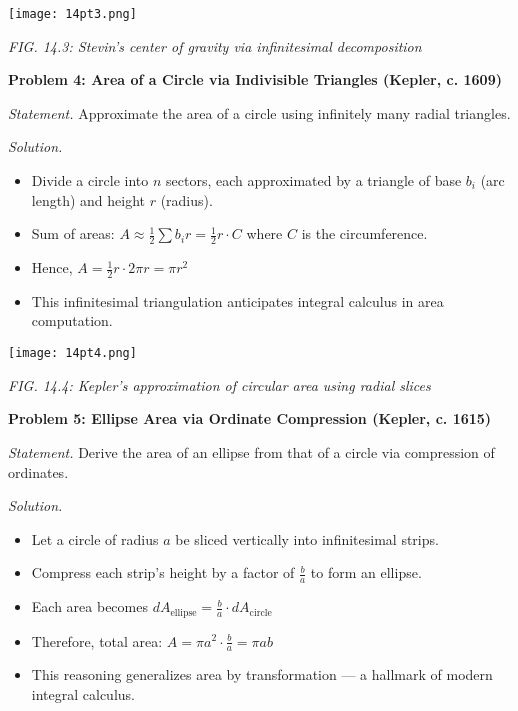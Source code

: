 \documentclass[9pt]{article}
\begin{document}
\begin{center}
    \texttt{[image: 14pt3.png]}

    \textit{FIG. 14.3: Stevin’s center of gravity via infinitesimal decomposition}
\end{center}

\newpage

\textbf{Problem 4: Area of a Circle via Indivisible Triangles (Kepler, c. 1609)}

\textit{Statement.} Approximate the area of a circle using infinitely many radial triangles.

\textit{Solution.}
\begin{itemize}
    \item Divide a circle into $n$ sectors, each approximated by a triangle of base $b_i$ (arc length) and height $r$ (radius).
    \item Sum of areas: $A \approx \tfrac{1}{2} \sum b_i r = \tfrac{1}{2} r \cdot C$ where $C$ is the circumference.
    \item Hence, $A = \tfrac{1}{2} r \cdot 2\pi r = \pi r^2$
    \item This infinitesimal triangulation anticipates integral calculus in area computation.
\end{itemize}

\begin{center}
    \texttt{[image: 14pt4.png]}

    \textit{FIG. 14.4: Kepler’s approximation of circular area using radial slices}
\end{center}

\newpage

\textbf{Problem 5: Ellipse Area via Ordinate Compression (Kepler, c. 1615)}

\textit{Statement.} Derive the area of an ellipse from that of a circle via compression of ordinates.

\textit{Solution.}
\begin{itemize}
    \item Let a circle of radius $a$ be sliced vertically into infinitesimal strips.
    \item Compress each strip’s height by a factor of $\frac{b}{a}$ to form an ellipse.
    \item Each area becomes $dA_{\text{ellipse}} = \tfrac{b}{a} \cdot dA_{\text{circle}}$
    \item Therefore, total area: $A = \pi a^2 \cdot \frac{b}{a} = \pi ab$
    \item This reasoning generalizes area by transformation — a hallmark of modern integral calculus.
\end{itemize}
\end{document}
